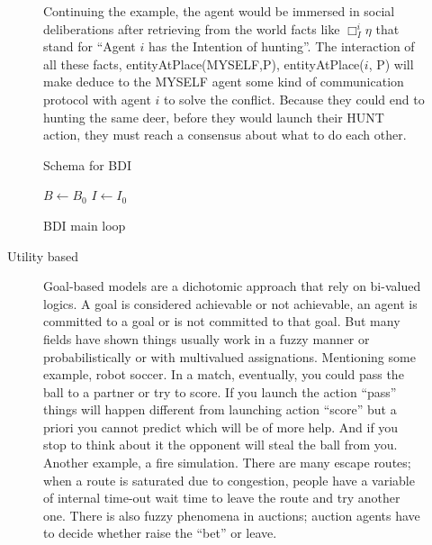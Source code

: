 \documentclass[11pt,oneside,a4paper,openright]{report}
\begin{document}
\begin{description}
\begin{description}
		Continuing the example, the agent would be immersed in social deliberations after retrieving from the
		world facts like $\Box_{I}^i \eta$ that stand for ``Agent $i$ has the Intention of hunting''. The 
		interaction of all these facts, entityAtPlace(MYSELF,P), entityAtPlace($i$, P) will make deduce to the
		MYSELF agent some kind of communication protocol with agent $i$ to solve the conflict. Because they could 
		end to hunting the same deer, before they would launch their HUNT action, they must reach a consensus about
		what to do each other. 

		Schema for BDI	

		\begin{algorithm}[H]
		\SetAlgoLined
		\BlankLine
		$B \gets B_0$\;
		$I \gets I_0$\;
		\caption{BDI main loop}
		\end{algorithm}



		\item[Utility based]

		Goal-based models are a dichotomic approach that rely on bi-valued logics. A goal is considered
		achievable or not achievable, an agent is committed to a goal or is not committed to that goal. But
		many fields have shown things usually work in a fuzzy manner or probabilistically or with multivalued
		assignations. Mentioning some example, robot soccer. In a match, eventually, you could pass the 
		ball to a partner or try to score. If you launch the action “pass” things will happen different 
		from launching action “score” but a priori you cannot predict which will be of more help. And if 
		you stop to think about it the opponent will steal the ball from you. Another example, a fire
		simulation. There are many escape routes; when a route is saturated due to congestion, people 
		have a variable of internal time-out wait time to leave the route and try another one. There is also 
		fuzzy phenomena in auctions; auction agents have to decide whether raise the ``bet'' or leave.


\end{description}
\end{description}
\end{document}
